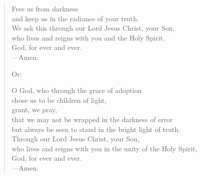 \prayer

\setlength{\leftmargini}{\prayerleftmargini}

\begin{verse}
Free us from darkness\\
and keep us in the radiance of your truth.\\
We ask this through our Lord Jesus Christ, your Son,\\
who lives and reigns with you and the Holy Spirit,\\
God, for ever and ever.\\
{\color{red}---\thinspace}Amen.

{\color{red}Or:}

O God, who through the grace of adoption\\
chose us to be children of light,\\
grant, we pray,\\
that we may not be wrapped in the darkness of error\\
but always be seen to stand in the bright light of truth.\\
Through our Lord Jesus Christ, your Son,\\
who lives and reigns with you in the unity of the Holy Spirit,\\
God, for ever and ever.\\
{\color{red}---\thinspace}Amen.
\end{verse}

\setlength{\leftmargini}{\defleftmargini}
